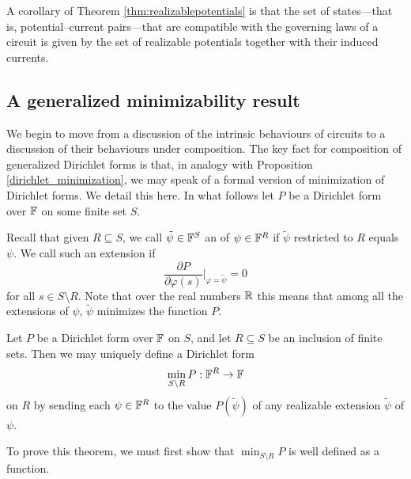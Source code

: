 A corollary of Theorem \ref{thm:realizablepotentials} is that the set of
states---that is, potential--current pairs---that are compatible with the
governing laws of a circuit is given by the set of realizable potentials
together with their induced currents. 

\subsection{A generalized minimizability result}

We begin to move from a discussion of the intrinsic behaviours of circuits to a
discussion of their behaviours under composition. The key fact for composition
of generalized Dirichlet forms is that, in analogy with Proposition
\ref{dirichlet_minimization}, we may speak of a formal version of minimization
of Dirichlet forms. We detail this here.  In what follows let $P$ be a Dirichlet
form over ${\mathbb F}$ on some finite set $S$. 

Recall that given $R \subseteq S$, we
call $\tilde\psi \in {\mathbb F}^S$ an  of $\psi \in {\mathbb F}^R$ if
$\tilde\psi$ restricted to $R$ equals $\psi$.   We call such an
extension  if 
\[
    \frac{\partial P}{\partial \varphi(s)}\bigg\vert_{\varphi = \tilde\psi} = 0
  \]
for all $s \in S \setminus R$.  Note that over the real numbers ${\mathbb{R}}$ this means
that among all the extensions of $\psi$, $\tilde\psi$ minimizes the function $P$.

\begin{theorem} \label{thm:dirichletminimization}
  Let $P$ be a Dirichlet form over ${\mathbb F}$ on $S$, and let $R \subseteq S$ be an
  inclusion of finite sets. Then we may uniquely define a Dirichlet form
  \[\min_{S \setminus R}P: {\mathbb F}^R \to {\mathbb F}\] 
   on $R$ by sending each $\psi \in {\mathbb F}^R$ to
  the value $P(\tilde\psi)$ of any realizable extension $\tilde\psi$ of $\psi$.
\end{theorem}


To prove this theorem, we must first show that $\min_{S \setminus R} P$ is well defined as a function.

